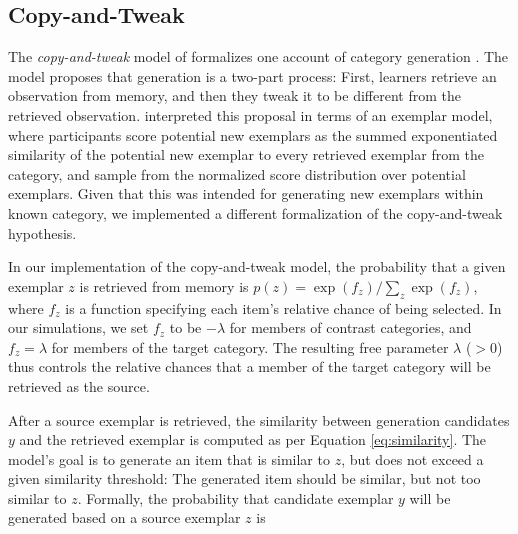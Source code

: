 \documentclass[10pt,letterpaper]{article}
\begin{document}
\subsection{Copy-and-Tweak}
The \textit{copy-and-tweak} model of \citet{jern2013probabilistic} formalizes one account of category generation \citep[see][]{ward2002role,ward1995s}. The model proposes that generation is a two-part process: First, learners retrieve an observation from memory, and then they tweak it to be different from the retrieved observation. \citet{jern2013probabilistic} interpreted this proposal in terms of an exemplar model, where participants score potential new exemplars as the summed exponentiated similarity of the potential new exemplar to every retrieved exemplar from the category, and sample from the normalized score distribution over potential exemplars. Given that this was intended for generating new exemplars within known category, we implemented a different formalization of the copy-and-tweak hypothesis.

In our implementation of the copy-and-tweak model, the probability that a given exemplar $z$ is retrieved from memory is $p(z) = \exp(f_z) / \sum_z{ \exp(f_z) }$, where $f_z$ is a function specifying each item's relative chance of being selected. In our simulations, we set $f_z$ to be $-\lambda$ for members of contrast categories, and $f_z = \lambda$ for members of the target category. The resulting free parameter $\lambda$ ($>0$) thus controls the relative chances that a member of the target category will be retrieved as the source. 

After a source exemplar is retrieved, the similarity between generation candidates $y$ and the retrieved exemplar is computed as per Equation \ref{eq:similarity}. The model's goal is to generate an item that is similar to $z$, but does not exceed a given similarity threshold: The generated item should be similar, but not too similar to $z$. Formally, the probability that candidate exemplar $y$ will be generated based on a source exemplar $z$ is 
\end{document}
